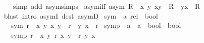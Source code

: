 \begin{isabellebody}
%
\isadelimproof
\ \ %
\endisadelimproof
%
\isatagproof
{}\isamarkupfalse%
\ {\isacharparenleft}{\kern0pt}simp\ add{\isacharcolon}{\kern0pt}\ asym{\isachardot}{\kern0pt}simps{\isacharparenright}{\kern0pt}%
\endisatagproof
{\isafoldproof}%
%
\isadelimproof
\isanewline
%
\endisadelimproof
\isanewline
{}\isamarkupfalse%
\ asym{\isacharunderscore}{\kern0pt}iff{\isacharcolon}{\kern0pt}\ {\isachardoublequoteopen}asym\ R\ {\isasymlongleftrightarrow}\ {\isacharparenleft}{\kern0pt}{\isasymforall}x\ y{\isachardot}{\kern0pt}\ {\isacharparenleft}{\kern0pt}x{\isacharcomma}{\kern0pt}y{\isacharparenright}{\kern0pt}\ {\isasymin}\ R\ {\isasymlongrightarrow}\ {\isacharparenleft}{\kern0pt}y{\isacharcomma}{\kern0pt}x{\isacharparenright}{\kern0pt}\ {\isasymnotin}\ R{\isacharparenright}{\kern0pt}{\isachardoublequoteclose}\isanewline
%
\isadelimproof
\ \ %
\endisadelimproof
%
\isatagproof
{}\isamarkupfalse%
\ {\isacharparenleft}{\kern0pt}blast\ intro{\isacharcolon}{\kern0pt}\ asymI\ dest{\isacharcolon}{\kern0pt}\ asymD{\isacharparenright}{\kern0pt}%
\endisatagproof
{\isafoldproof}%
%
\isadelimproof
%
\endisadelimproof
%
\isadelimdocument
%
\endisadelimdocument
%
\isatagdocument
%
\isamarkuptrue%
%
\endisatagdocument
{\isafolddocument}%
%
\isadelimdocument
%
\endisadelimdocument
{}\isamarkupfalse%
\ sym\ {\isacharcolon}{\kern0pt}{\isacharcolon}{\kern0pt}\ {\isachardoublequoteopen}{\isacharprime}{\kern0pt}a\ rel\ {\isasymRightarrow}\ bool{\isachardoublequoteclose}\isanewline
\ \ \ {\isachardoublequoteopen}sym\ r\ {\isasymlongleftrightarrow}\ {\isacharparenleft}{\kern0pt}{\isasymforall}x\ y{\isachardot}{\kern0pt}\ {\isacharparenleft}{\kern0pt}x{\isacharcomma}{\kern0pt}\ y{\isacharparenright}{\kern0pt}\ {\isasymin}\ r\ {\isasymlongrightarrow}\ {\isacharparenleft}{\kern0pt}y{\isacharcomma}{\kern0pt}\ x{\isacharparenright}{\kern0pt}\ {\isasymin}\ r{\isacharparenright}{\kern0pt}{\isachardoublequoteclose}\isanewline
\isanewline
{}\isamarkupfalse%
\ symp\ {\isacharcolon}{\kern0pt}{\isacharcolon}{\kern0pt}\ {\isachardoublequoteopen}{\isacharparenleft}{\kern0pt}{\isacharprime}{\kern0pt}a\ {\isasymRightarrow}\ {\isacharprime}{\kern0pt}a\ {\isasymRightarrow}\ bool{\isacharparenright}{\kern0pt}\ {\isasymRightarrow}\ bool{\isachardoublequoteclose}\isanewline
\ \ \ {\isachardoublequoteopen}symp\ r\ {\isasymlongleftrightarrow}\ {\isacharparenleft}{\kern0pt}{\isasymforall}x\ y{\isachardot}{\kern0pt}\ r\ x\ y\ {\isasymlongrightarrow}\ r\ y\ x{\isacharparenright}{\kern0pt}{\isachardoublequoteclose}\isanewline

\end{isabellebody}
